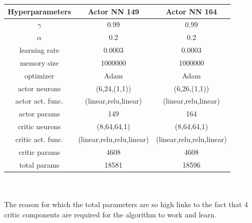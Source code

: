 \newline
\vspace{0.5 cm}
\newline
\begin{tabular}{|c|c|c|}
	\hline
	Hyperparameters & Actor NN 149 & Actor NN 164 \\
	\hline
	$\gamma$  & 0.99 & 0.99 \\
	\hline
	$\alpha$ & 0.2 & 0.2 \\
	\hline
	learning rate  & 0.0003 & 0.0003 \\
	\hline
	memory size  & 1000000 & 1000000 \\
	\hline
	optimizer  & Adam & Adam \\
	\hline
	actor neurons & (6,24,(1,1)) & (6,26,(1,1)) \\
	\hline
	actor act. func. & (linear,relu,linear) & (linear,relu,linear) \\
	\hline
	actor params & 149 & 164 \\
	\hline
	critic neurons & (8,64,64,1) & (8,64,64,1) \\
	\hline
	critic act. func. & (linear,relu,relu,linear) & (linear,relu,relu,linear) \\
	\hline
	critic params & 4608 & 4608 \\
	\hline
	total params  & 18581 & 18596 \\
	\hline
\end{tabular}\\
\\
The reason for which the total parameters are so high links to the fact that 4 critic components are required for the algorithm to work and learn.
